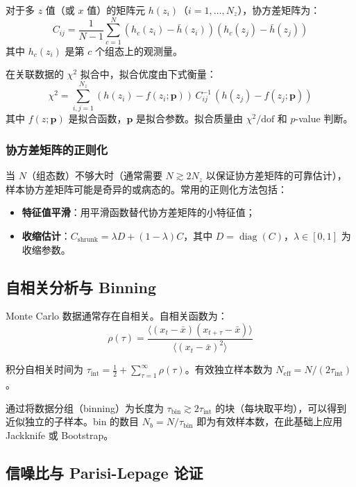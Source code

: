 \documentclass[11pt,a4paper]{ctexart}
\newcommand{\diag}{\operatorname{diag}}
\begin{document}
对于多 $z$ 值（或 $x$ 值）的矩阵元 $h(z_i)$（$i=1,\ldots,N_z$），协方差矩阵为：
\begin{equation}
C_{ij} = \frac{1}{N-1} \sum_{c=1}^{N} (h_c(z_i) - \bar{h}(z_i)) (h_c(z_j) - \bar{h}(z_j))
\end{equation}
其中 $h_c(z_i)$ 是第 $c$ 个组态上的观测量。

在关联数据的 $\chi^2$ 拟合中，拟合优度由下式衡量：
\begin{equation}
\chi^2 = \sum_{i,j=1}^{N_z} (h(z_i) - f(z_i; \mathbf{p})) \, C^{-1}_{ij} \,
(h(z_j) - f(z_j; \mathbf{p}))
\end{equation}
其中 $f(z; \mathbf{p})$ 是拟合函数，$\mathbf{p}$ 是拟合参数。拟合质量由 $\chi^2/\text{dof}$ 和 $p$-value 判断。

\subsubsection{协方差矩阵的正则化}

当 $N$（组态数）不够大时（通常需要 $N \gtrsim 2N_z$ 以保证协方差矩阵的可靠估计），样本协方差矩阵可能是奇异的或病态的。常用的正则化方法包括：
\begin{itemize}
  \item \textbf{特征值平滑}：用平滑函数替代协方差矩阵的小特征值；
  \item \textbf{收缩估计}：$C_{\text{shrunk}} = \lambda D + (1-\lambda) C$，其中 $D = \diag(C)$，$\lambda \in [0,1]$ 为收缩参数。
\end{itemize}

\subsection{自相关分析与 Binning}

Monte Carlo 数据通常存在自相关。自相关函数为：
\begin{equation}
\rho(\tau) = \frac{\langle (x_t - \bar{x})(x_{t+\tau} - \bar{x}) \rangle}{\langle (x_t - \bar{x})^2 \rangle}
\end{equation}

积分自相关时间为 $\tau_{\text{int}} = \frac{1}{2} + \sum_{\tau=1}^{\infty} \rho(\tau)$。有效独立样本数为 $N_{\text{eff}} = N / (2\tau_{\text{int}})$。

通过将数据分组（binning）为长度为 $\tau_{\text{bin}} \gtrsim 2\tau_{\text{int}}$ 的块（每块取平均），可以得到近似独立的子样本。bin 的数目 $N_b = N/\tau_{\text{bin}}$ 即为有效样本数，在此基础上应用 Jackknife 或 Bootstrap。

\subsection{信噪比与 Parisi-Lepage 论证}
\end{document}
